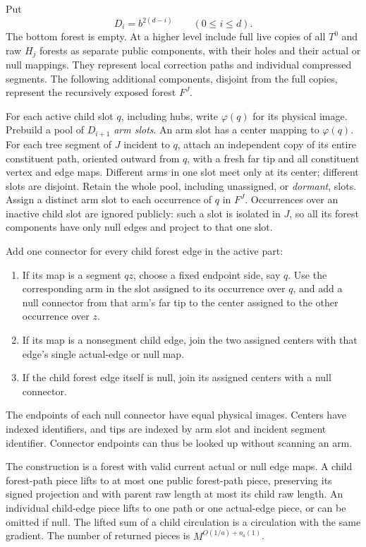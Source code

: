 Put
\begin{equation}
                D_i=b^{2(d-i)}\qquad(0\le i\le d).
 \label{update:occurrence-bounds}
\end{equation}
The bottom forest is empty.  At a higher level include full live
copies of all $T^0$ and raw $H_j$ forests as separate public
components, with their holes and their actual or null mappings.
They represent local correction paths and individual compressed
segments.  The following additional components, disjoint from the
full copies, represent the recursively exposed forest $F^J$.

For each active child slot $q$, including hubs, write $\varphi(q)$
for its physical image.  Prebuild a pool of $D_{i+1}$ \emph{arm slots}.
An arm slot has a center mapping to $\varphi(q)$.  For each tree
segment of $J$ incident to $q$, attach an independent copy of its
entire constituent path, oriented outward from $q$, with a fresh far
tip and all constituent vertex and edge maps.  Different arms in
one slot meet only at its center; different slots are disjoint.
Retain the whole pool, including unassigned, or \emph{dormant}, slots.
Assign a distinct arm slot to each occurrence of $q$ in $F^J$.
Occurrences over an inactive child slot are ignored publicly: such
a slot is isolated in $J$, so all its forest components have only
null edges and project to that one slot.

Add one connector for every child forest edge in the active part:
\begin{enumerate}
\item If its map is a segment $qz$, choose a fixed endpoint side,
say $q$.  Use the corresponding arm in the slot assigned to its
occurrence over $q$, and add a null connector from that arm's far
tip to the center assigned to the other occurrence over $z$.
\item If its map is a nonsegment child edge, join the two assigned
centers with that edge's single actual-edge or null map.
\item If the child forest edge itself is null, join its assigned
centers with a null connector.
\end{enumerate}
The endpoints of each null connector have equal physical images.
Centers have indexed identifiers, and tips are indexed by arm slot
and incident segment identifier.  Connector endpoints can thus be
looked up without scanning an arm.

\begin{lemma}
The construction is a forest with valid current actual or null edge
maps.  \label{update:flat-lift}
A child forest-path piece lifts to at most one public forest-path
piece, preserving its signed projection and with parent raw length
at most its child raw length.  An individual child-edge piece lifts
to one path or one actual-edge piece, or can be omitted if null.
The lifted sum of a child circulation is a circulation with the same
gradient.  The number of returned pieces is
$M^{O(1/a)+o_a(1)}$.
\end{lemma}

